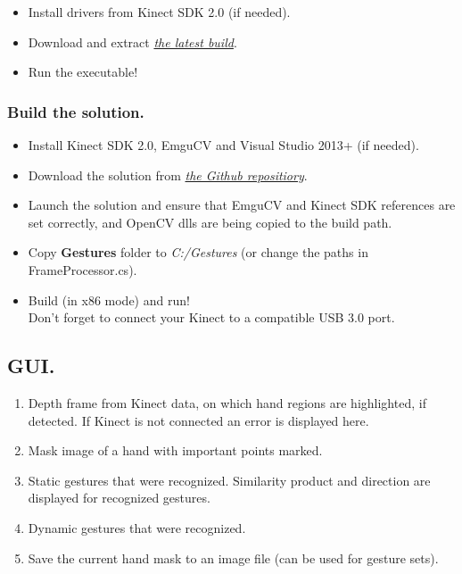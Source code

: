 \documentclass[a4paper,11pt,oneside]{article}
\begin{document}
\begin{itemize}
\item Install drivers from Kinect SDK 2.0 (if needed).
\item Download and extract \href{https://github.com/dmitryfd/KinectGR}{\textit{the latest build}}.
\item Run the executable!
\end{itemize}

\subsubsection{Build the solution.}

\begin{itemize}
\item Install Kinect SDK 2.0, EmguCV and Visual Studio 2013+ (if needed).
\item Download the solution from \href{https://github.com/dmitryfd/KinectGR}{\textit{the Github repositiory}}.
\item Launch the solution and ensure that EmguCV and Kinect SDK references are set correctly, and OpenCV dlls are being copied to the build path. 
\item Copy \textbf{Gestures} folder to \textit{C:/Gestures} (or change the paths in FrameProcessor.cs).
\item Build (in x86 mode) and run! \\Don't forget to connect your Kinect to a compatible USB 3.0 port.
\end{itemize}

\subsection{GUI.}


\begin{enumerate}
\item Depth frame from Kinect data, on which hand regions are highlighted, if detected. If Kinect is not connected an error is displayed here.
\item Mask image of a hand with important points marked.
\item Static gestures that were recognized. Similarity product and direction are displayed for recognized gestures.
\item Dynamic gestures that were recognized.
\item Save the current hand mask to an image file (can be used for gesture sets).
\end{enumerate}
\end{document}
